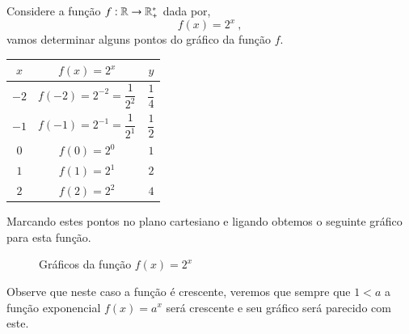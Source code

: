  \begin{exem}\label{ex:exp-2}
  Considere a função $f: \mathbb{R} \rightarrow \mathbb{R}_{+}^{*} $ dada por,
  \[f(x) = 2^x \ , \]
  vamos determinar alguns pontos do gráfico da função $f$.

  \begin{table}[H]
  \centering
  \begin{tabular}{|c|c|c|} \hline
  \rowcolor{cinza}
  $x$ & $f(x) = 2^x$ & $y$ \\ \hline
  $-2$ & $f(-2)= 2^{-2}= \dfrac{1}{2^2}$ & $\dfrac{1}{4}$ \\ \hline
  $-1$ & $f(-1)= 2^{-1}= \dfrac{1}{2^1}$ & $\dfrac{1}{2}$ \\ \hline
  $0$ & $f(0)= 2^{0}$ & $1$ \\ \hline
  $1$ & $f(1)= 2^{1}$ & $2$ \\ \hline
  $2$ & $f(2)= 2^{2}$ & $4$ \\ \hline
  \end{tabular}
  \end{table}

  Marcando estes pontos no plano cartesiano e ligando obtemos o seguinte gráfico para esta função.

  \begin{figure}[H]
  \centering
    \caption{Gráficos da função $f(x)=2^x$}
  \end{figure}

  Observe que neste caso a função é crescente, veremos que sempre que $1< a$ a função exponencial $f(x)=a^x$ será crescente e seu gráfico será parecido com este.

 \end{exem}


